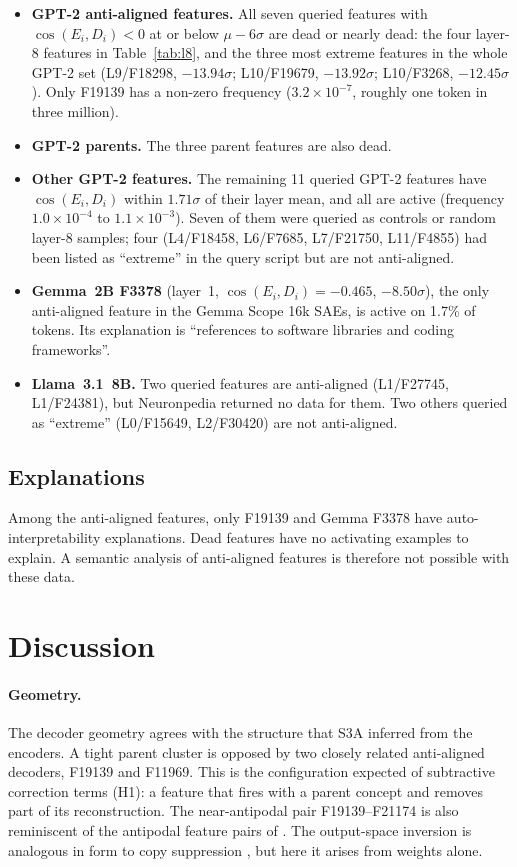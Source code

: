 \documentclass[11pt,a4paper]{article}
\newcommand{\cosED}{\cos(E_i, D_i)}
\begin{document}
\begin{itemize}[noitemsep]
  \item \textbf{GPT-2 anti-aligned features.} All seven queried features with $\cosED < 0$ at or below $\mu - 6\sigma$ are dead or nearly dead: the four layer-8 features in Table~\ref{tab:l8}, and the three most extreme features in the whole GPT-2 set (L9/F18298, $-13.94\sigma$; L10/F19679, $-13.92\sigma$; L10/F3268, $-12.45\sigma$). Only F19139 has a non-zero frequency ($3.2\times10^{-7}$, roughly one token in three million).
  \item \textbf{GPT-2 parents.} The three parent features are also dead.
  \item \textbf{Other GPT-2 features.} The remaining 11 queried GPT-2 features have $\cosED$ within $1.71\sigma$ of their layer mean, and all are active (frequency $1.0\times10^{-4}$ to $1.1\times10^{-3}$). Seven of them were queried as controls or random layer-8 samples; four (L4/F18458, L6/F7685, L7/F21750, L11/F4855) had been listed as ``extreme'' in the query script but are not anti-aligned.
  \item \textbf{Gemma~2B F3378} (layer~1, $\cosED = -0.465$, $-8.50\sigma$), the only anti-aligned feature in the Gemma Scope 16k SAEs, is active on 1.7\% of tokens. Its explanation is ``references to software libraries and coding frameworks''.
  \item \textbf{Llama~3.1~8B.} Two queried features are anti-aligned (L1/F27745, L1/F24381), but Neuronpedia returned no data for them. Two others queried as ``extreme'' (L0/F15649, L2/F30420) are not anti-aligned.
\end{itemize}

\subsection{Explanations}

Among the anti-aligned features, only F19139 and Gemma F3378 have auto-interpretability explanations. Dead features have no activating examples to explain. A semantic analysis of anti-aligned features is therefore not possible with these data.

\section{Discussion}

\paragraph{Geometry.} The decoder geometry agrees with the structure that S3A inferred from the encoders. A tight parent cluster is opposed by two closely related anti-aligned decoders, F19139 and F11969. This is the configuration expected of subtractive correction terms (H1): a feature that fires with a parent concept and removes part of its reconstruction. The near-antipodal pair F19139--F21174 is also reminiscent of the antipodal feature pairs of \citet{elhage2022}. The output-space inversion is analogous in form to copy suppression \citep{mcdougall2023}, but here it arises from weights alone.
\end{document}
